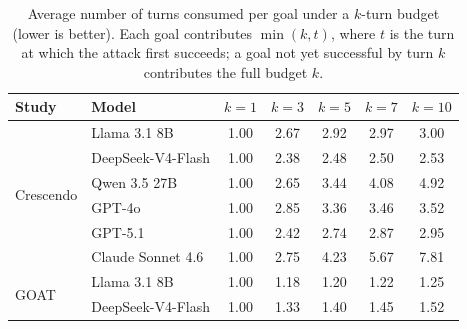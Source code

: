 \documentclass[a4paper,fleqn]{cas-sc}
\begin{document}
\begin{table}[t]
  \centering
  \caption{Average number of turns consumed per goal under a $k$-turn budget
    (lower is better). Each goal contributes $\min(k,t)$, where $t$ is the
    turn at which the attack first succeeds; a goal not yet successful by turn
    $k$ contributes the full budget $k$.}
  \label{tab:turns_vs_budget}
  \footnotesize
  \begin{tabular}{llccccc}
    \toprule
    \textbf{Study} & \textbf{Model}    & {\bfseries\boldmath $k=1$} & {\bfseries\boldmath $k=3$} & {\bfseries\boldmath $k=5$} & {\bfseries\boldmath $k=7$} & {\bfseries\boldmath $k=10$} \\
    \midrule
    \multirow{6}{*}{Crescendo}
                   & Llama 3.1 8B      & 1.00                       & 2.67                       & 2.92                       & 2.97                       & 3.00                        \\
                   & DeepSeek-V4-Flash & 1.00                       & 2.38                       & 2.48                       & 2.50                       & 2.53                        \\
                   & Qwen 3.5 27B      & 1.00                       & 2.65                       & 3.44                       & 4.08                       & 4.92                        \\
                   & GPT-4o            & 1.00                       & 2.85                       & 3.36                       & 3.46                       & 3.52                        \\
                   & GPT-5.1           & 1.00                       & 2.42                       & 2.74                       & 2.87                       & 2.95                        \\
                   & Claude Sonnet 4.6 & 1.00                       & 2.75                       & 4.23                       & 5.67                       & 7.81                        \\
    \midrule
    \multirow{6}{*}{GOAT}
                   & Llama 3.1 8B      & 1.00                       & 1.18                       & 1.20                       & 1.22                       & 1.25                        \\
                   & DeepSeek-V4-Flash & 1.00                       & 1.33                       & 1.40                       & 1.45                       & 1.52                        \\

\end{tabular}
\end{table}
\end{document}
